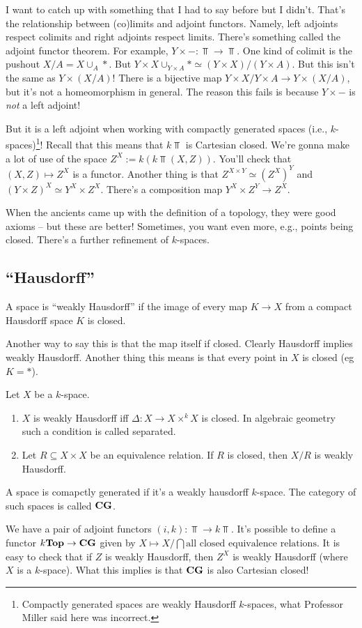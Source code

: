 I want to catch up with something that I had to say before but I didn't. That's the relationship between (co)limits and adjoint functors. Namely, left adjoints respect colimits and right adjoints respect limits. There's something called the adjoint functor theorem. For example, $Y\times -:\Top\to\Top$. One kind of colimit is the pushout $X/A=X\cup_A \ast$. But $Y\times X\cup_{Y\times A}\ast\simeq (Y\times X)/(Y\times A)$. But this isn't the same as $Y\times (X/A)$! There is a bijective map $Y\times X/Y\times A\to Y\times(X/A)$, but it's not a homeomorphism in general. The reason this fails is because $Y\times -$ is \emph{not} a left adjoint!

But it is a left adjoint when working with compactly generated spaces (i.e., $k$-spaces)\footnote{Compactly generated spaces are weakly Hausdorff $k$-spaces, what Professor Miller said here was incorrect.}! Recall that this means that $k\Top$ is Cartesian closed. We're gonna make a lot of use of the space $Z^X:=k(k\Top(X,Z))$. You'll check that $(X,Z)\mapsto Z^X$ is a functor. Another thing is that $Z^{X\times Y}\simeq (Z^X)^Y$ and $(Y\times Z)^X\simeq Y^X\times Z^X$. There's a composition map $Y^X\times Z^Y\to Z^X$.

When the ancients came up with the definition of a topology, they were good axioms -- but these are better! Sometimes, you want even more, e.g., points being closed. There's a further refinement of $k$-spaces. 
\subsection{``Hausdorff''}
\begin{definition}
    A space is ``weakly Hausdorff'' if the image of every map $K\to X$ from a compact Hausdorff space $K$ is closed.
\end{definition}
Another way to say this is that the map itself if closed. Clearly Hausdorff implies weakly Hausdorff. Another thing this means is that every point in $X$ is closed (eg $K=\ast$). 
\begin{prop}
    Let $X$ be a $k$-space.
    \begin{enumerate}
	\item $X$ is weakly Hausdorff iff $\Delta:X\to X\times^k X$ is closed. In algebraic geometry such a condition is called separated.
	\item Let $R\subseteq X\times X$ be an equivalence relation. If $R$ is closed, then $X/R$ is weakly Hausdorff.
    \end{enumerate}
\end{prop}
\begin{definition}
    A space is comapctly generated if it's a weakly hausdorff $k$-space. The category of such spaces is called $\mathbf{CG}$.
\end{definition}
We have a pair of adjoint functors $(i,k):\Top\to k\Top$. It's possible to define a functor $k\mathbf{Top}\to \mathbf{CG}$ given by $X\mapsto X/\bigcap\text{all closed equivalence relations}$. It is easy to check that if $Z$ is weakly Hausdorff, then $Z^X$ is weakly Hausdorff (where $X$ is a $k$-space). What this implies is that $\mathbf{CG}$ is also Cartesian closed!

